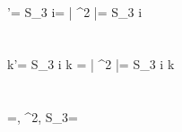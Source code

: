 \\
{\omega}'= S_3  i\omega = \left | \beta^2  \right |= S_3 \frac {\beta}{\left | \beta \right |} \sqrt {}i\omega
\\
\\
\\
{k}'= S_3  i k = \left | \beta^2  \right |= S_3 \frac {\beta}{\left | \beta \right |}\sqrt {}i k
\\
\\
\\
\beta=, \beta^2, S_3= 
